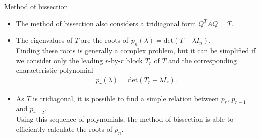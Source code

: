 \documentclass[t,usepdftitle=false]{beamer}
\begin{document}
\begin{frame}{Method of bissection}
\begin{itemize}
\item The method of bissection also considers a tridiagonal form $Q^TAQ=T$.
\item The eigenvalues of $T$ are the roots of $p_n(\lambda)=\mathrm{det}(T-\lambda I_n)$.\vspace{.1cm}\\
Finding these roots is generally a complex problem, but it can be simplified if we consider only the leading $r$-by-$r$ block $T_r$ of $T$ and the corresponding characteristic polynomial
\begin{align*}
p_r(\lambda)=\mathrm{det}(T_r-\lambda I_r).
\end{align*}
\item As $T$ is tridiagonal, it is possible to find a simple relation between $p_r$, $p_{r-1}$ and $p_{r-2}$.\vspace{.1cm}\\
Using this sequence of polynomials, the method of bissection is able to efficiently calculate the roots of $p_n$.
\end{itemize}
\end{frame}
\end{document}
